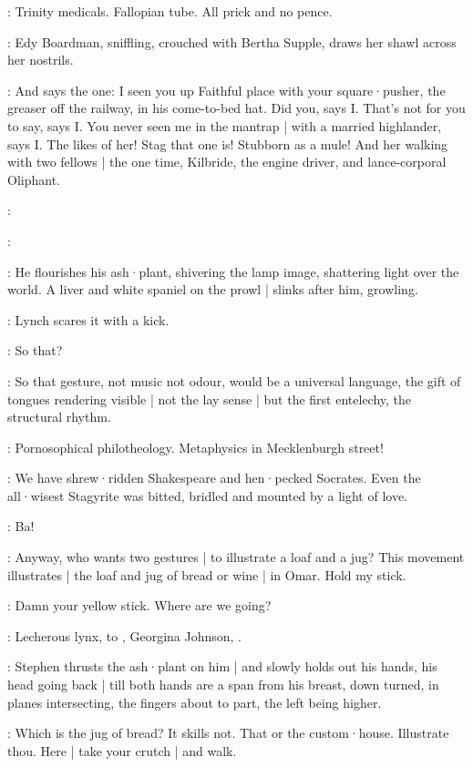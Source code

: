 \Bawd:
Trinity medicals.
Fallopian tube.
All prick and no pence.

:
Edy Boardman,
sniffling,
crouched with Bertha Supple,
draws her shawl across her nostrils.

\Edy:
And says the one:
I seen you up Faithful place with your square·pusher,
the greaser off the railway,
in his come-to-bed hat.
Did you,
says I.
That's not for you to say,
says I.
You never seen me in the mantrap |
with a married highlander,
says I.
The likes of her!
Stag that one is!
Stubborn as a mule!
And her walking with two fellows |
the one time,
Kilbride,
the engine driver,
and lance-corporal Oliphant.

:

\Stephen:

:
He flourishes his ash·plant,
shivering the lamp image,
shattering light over the world.
A liver and white spaniel on the prowl |
slinks after him,
growling.

:
Lynch scares it with a kick.

\Lynch:
So that?

\Stephen:
\sout{}
So that gesture,
not music not odour,
would be a universal language,
the gift of tongues rendering visible |
not the lay sense |
but the first entelechy,
the structural rhythm.

\Lynch:
Pornosophical philotheology.
Metaphysics in Mecklenburgh street!

\Stephen:
We have shrew·ridden Shakespeare and hen·pecked Socrates.
Even the all·wisest Stagyrite was bitted,
bridled and mounted by a light of love.

\Lynch:
Ba!

\Stephen:
Anyway,
who wants two gestures |
to illustrate a loaf and a jug?
This movement illustrates |
the loaf and jug of bread or wine |
in Omar.
Hold my stick.

\Lynch:
Damn your yellow stick.
Where are we going?

\Stephen:
Lecherous lynx,
to ,
Georgina Johnson,
.

:
Stephen thrusts the ash·plant on him |
and slowly holds out his hands,
his head going back |
till both hands are a span from his breast,
down turned,
in planes intersecting,
the fingers about to part,
the left being higher.

\Lynch:
Which is the jug of bread?
It skills not.
That or the custom·house.
Illustrate thou.
Here |
take your crutch |
and walk.

